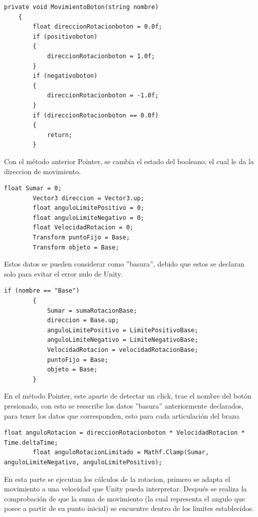 \begin{lstlisting}[frame=single]
    private void MovimientoBoton(string nombre)
    {
        float direccionRotacionboton = 0.0f;
        if (positivoboton)
        {
            direccionRotacionboton = 1.0f;
        }
        if (negativoboton)
        {
            direccionRotacionboton = -1.0f;
        }
        if (direccionRotacionboton == 0.0f)
        {
            return;
        }
\end{lstlisting}
Con el método anterior Pointer, se cambia el estado del booleano, el cual le da la direccion de movimiento.

\begin{lstlisting}[frame=single]
        float Sumar = 0;
        Vector3 direccion = Vector3.up;
        float anguloLimitePositivo = 0;
        float anguloLimiteNegativo = 0;
        float VelocidadRotacion = 0;
        Transform puntoFijo = Base;
        Transform objeto = Base;
\end{lstlisting}
Estos datos se pueden considerar como ''basura'', debido que estos se declaran solo para evitar el error nulo de Unity.

\begin{lstlisting}[frame=single]
        if (nombre == "Base")
        {
            Sumar = sumaRotacionBase;
            direccion = Base.up;
            anguloLimitePositivo = LimitePositivoBase;
            anguloLimiteNegativo = LimiteNegativoBase;
            VelocidadRotacion = velocidadRotacionBase;
            puntoFijo = Base;
            objeto = Base;
        }
\end{lstlisting}
En el método Pointer, este aparte de detectar un click, trae el nombre del botón presionado, con esto se reescribe los datos ''basura'' anteriormente declarados, para tener los datos que corresponden, esto para cada articulación del brazo.

\begin{lstlisting}[frame=single]
        float anguloRotacion = direccionRotacionboton * VelocidadRotacion * Time.deltaTime;
        float anguloRotacionLimitado = Mathf.Clamp(Sumar, anguloLimiteNegativo, anguloLimitePositivo);
\end{lstlisting}
En esta parte se ejecutan los cálculos de la rotacion, primero se adapta el movimiento a una velocidad que Unity pueda interpretar.
Después se realiza la comprobación de que la suma de movimiento (la cual representa el angulo que posee a partir de su punto inicial) se encuentre dentro de los limites establecidos.


